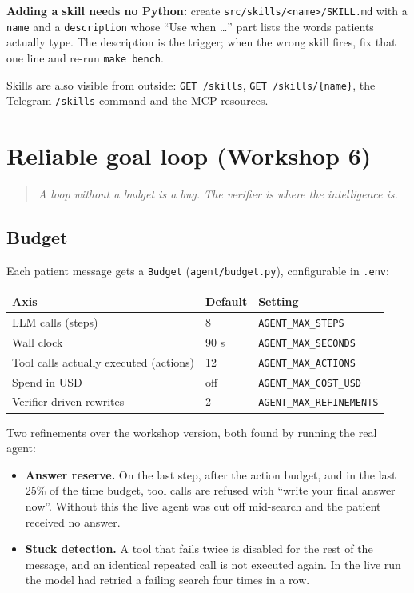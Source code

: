 \documentclass[11pt,a4paper]{article}
\newcommand{\code}[1]{\texttt{#1}}
\begin{document}
\textbf{Adding a skill needs no Python:} create \code{src/skills/<name>/SKILL.md} with a \code{name} and a \code{description} whose ``Use when \ldots'' part lists the words patients actually type. The description is the trigger; when the wrong skill fires, fix that one line and re-run \code{make bench}.

Skills are also visible from outside: \code{GET /skills}, \code{GET /skills/\{name\}}, the Telegram \code{/skills} command and the MCP resources.

\section{Reliable goal loop (Workshop 6)}

\begin{quote}\itshape A loop without a budget is a bug. The verifier is where the intelligence is.\end{quote}

\subsection{Budget}
Each patient message gets a \code{Budget} (\code{agent/budget.py}), configurable in \code{.env}:

\begin{center}\small
\begin{tabular}{@{}lll@{}}
\toprule
\textbf{Axis} & \textbf{Default} & \textbf{Setting} \\
\midrule
LLM calls (steps) & 8 & \code{AGENT\_MAX\_STEPS} \\
Wall clock & 90 s & \code{AGENT\_MAX\_SECONDS} \\
Tool calls actually executed (actions) & 12 & \code{AGENT\_MAX\_ACTIONS} \\
Spend in USD & off & \code{AGENT\_MAX\_COST\_USD} \\
Verifier-driven rewrites & 2 & \code{AGENT\_MAX\_REFINEMENTS} \\
\bottomrule
\end{tabular}
\end{center}

Two refinements over the workshop version, both found by running the real agent:
\begin{itemize}
  \item \textbf{Answer reserve.} On the last step, after the action budget, and in the last 25\% of the time budget, tool calls are refused with ``write your final answer now''. Without this the live agent was cut off mid-search and the patient received no answer.
  \item \textbf{Stuck detection.} A tool that fails twice is disabled for the rest of the message, and an identical repeated call is not executed again. In the live run the model had retried a failing search four times in a row.
\end{itemize}
\end{document}
